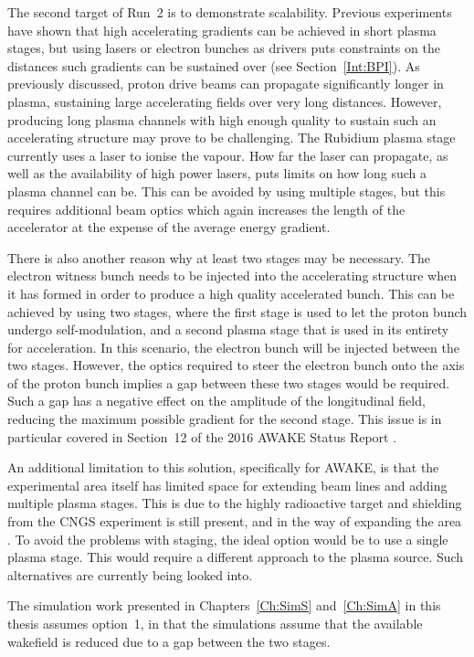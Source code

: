 The second target of Run~2 is to demonstrate scalability.
Previous experiments have shown that high accelerating gradients can be achieved in short plasma stages, but using lasers or electron bunches as drivers puts constraints on the distances such gradients can be sustained over (see Section~\ref{Int:BPI}).
As previously discussed, proton drive beams can propagate significantly longer in plasma, sustaining large accelerating fields over very long distances.
However, producing long plasma channels with high enough quality to sustain such an accelerating structure may prove to be challenging.
The Rubidium plasma stage currently uses a laser to ionise the vapour.
How far the laser can propagate, as well as the availability of high power lasers, puts limits on how long such a plasma channel can be.
This can be avoided by using multiple stages, but this requires additional beam optics which again increases the length of the accelerator at the expense of the average energy gradient.

There is also another reason why at least two stages may be necessary.
The electron witness bunch needs to be injected into the accelerating structure when it has formed in order to produce a high quality accelerated bunch.
This can be achieved by using two stages, where the first stage is used to let the proton bunch undergo self-modulation, and a second plasma stage that is used in its entirety for acceleration.
In this scenario, the electron bunch will be injected between the two stages.
However, the optics required to steer the electron bunch onto the axis of the proton bunch implies a gap between these two stages would be required.
Such a gap has a negative effect on the amplitude of the longitudinal field, reducing the maximum possible gradient for the second stage.
This issue is in particular covered in Section~12 of the 2016 AWAKE Status Report \cite{awake_collaboration:2016}.

An additional limitation to this solution, specifically for AWAKE, is that the experimental area itself has limited space for extending beam lines and adding multiple plasma stages.
This is due to the highly radioactive target and shielding from the CNGS experiment is still present, and in the way of expanding the area \cite{adli:2016a}.
To avoid the problems with staging, the ideal option would be to use a single plasma stage.
This would require a different approach to the plasma source.
Such alternatives are currently being looked into.

The simulation work presented in Chapters~\ref{Ch:SimS} and~\ref{Ch:SimA} in this thesis assumes option~1, in that the simulations assume that the available wakefield is reduced due to a gap between the two stages.

